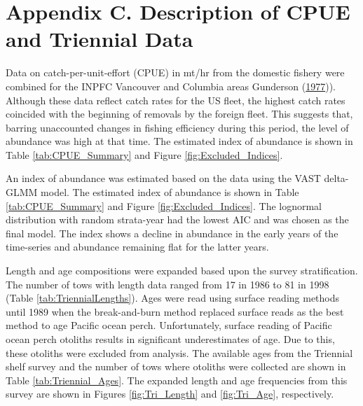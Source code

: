 \documentclass[12pt,]{article}
\begin{document}
\FloatBarrier

\section{Appendix C. Description of CPUE and Triennial
Data}\label{appendix-c.-description-of-cpue-and-triennial-data}

Data on catch-per-unit-effort (CPUE) in mt/hr from the domestic fishery
were combined for the INPFC Vancouver and Columbia areas Gunderson
(\protect\hyperlink{ref-gunderson_population_1977}{1977})). Although
these data reflect catch rates for the US fleet, the highest catch rates
coincided with the beginning of removals by the foreign fleet. This
suggests that, barring unaccounted changes in fishing efficiency during
this period, the level of abundance was high at that time. The estimated
index of abundance is shown in Table \ref{tab:CPUE_Summary} and Figure
\ref{fig:Excluded_Indices}.

An index of abundance was estimated based on the data using the VAST
delta-GLMM model. The estimated index of abundance is shown in Table
\ref{tab:CPUE_Summary} and Figure \ref{fig:Excluded_Indices}. The
lognormal distribution with random strata-year had the lowest AIC and
was chosen as the final model. The index shows a decline in abundance in
the early years of the time-series and abundance remaining flat for the
latter years.

Length and age compositions were expanded based upon the survey
stratification. The number of tows with length data ranged from 17 in
1986 to 81 in 1998 (Table \ref{tab:TriennialLengths}). Ages were read
using surface reading methods until 1989 when the break-and-burn method
replaced surface reads as the best method to age Pacific ocean perch.
Unfortunately, surface reading of Pacific ocean perch otoliths results
in significant underestimates of age. Due to this, these otoliths were
excluded from analysis. The available ages from the Triennial shelf
survey and the number of tows where otoliths were collected are shown in
Table \ref{tab:Triennial_Ages}. The expanded length and age frequencies
from this survey are shown in Figures \ref{fig:Tri_Length} and
\ref{fig:Tri_Age}, respectively.
\end{document}
